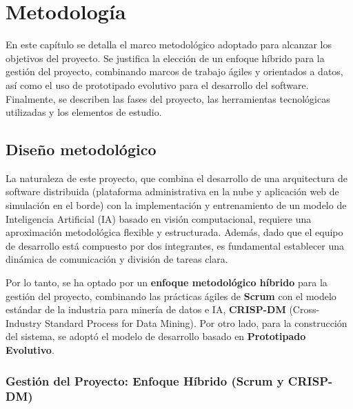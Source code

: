
\chapter{Metodología}

En este capítulo se detalla el marco metodológico adoptado para alcanzar los objetivos del proyecto. Se justifica la elección de un enfoque híbrido para la gestión del proyecto, combinando marcos de trabajo ágiles y orientados a datos, así como el uso de prototipado evolutivo para el desarrollo del software. Finalmente, se describen las fases del proyecto, las herramientas tecnológicas utilizadas y los elementos de estudio.

\section{Diseño metodológico}

La naturaleza de este proyecto, que combina el desarrollo de una arquitectura de software distribuida (plataforma administrativa en la nube y aplicación web de simulación en el borde) con la implementación y entrenamiento de un modelo de Inteligencia Artificial (IA) basado en visión computacional, requiere una aproximación metodológica flexible y estructurada. Además, dado que el equipo de desarrollo está compuesto por dos integrantes, es fundamental establecer una dinámica de comunicación y división de tareas clara.

Por lo tanto, se ha optado por un \textbf{enfoque metodológico híbrido} para la gestión del proyecto, combinando las prácticas ágiles de \textbf{Scrum} con el modelo estándar de la industria para minería de datos e IA, \textbf{CRISP-DM} (Cross-Industry Standard Process for Data Mining).
Por otro lado, para la construcción del sistema, se adoptó el modelo de desarrollo basado en \textbf{Prototipado Evolutivo}.

\subsection{Gestión del Proyecto: Enfoque Híbrido (Scrum y CRISP-DM)}

